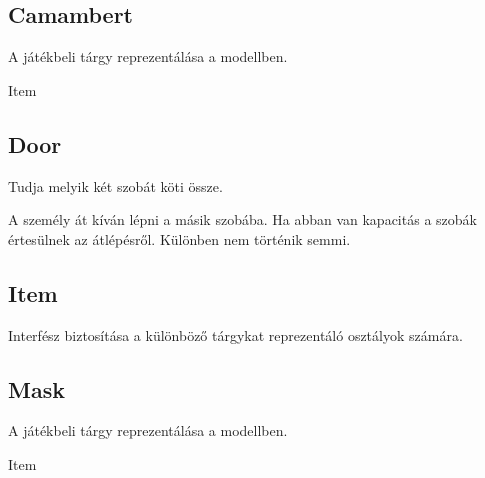 \subsection{Camambert}
\begin{class-template-responsibility}
A játékbeli tárgy reprezentálása a modellben.
\end{class-template-responsibility}
\begin{class-template-interface}
    Item
\end{class-template-interface}

\subsection{Door}
\begin{class-template-responsibility}
    Tudja melyik két szobát köti össze.
    \end{class-template-responsibility}
\begin{class-template-method}
     { A személy át kíván lépni a másik szobába. Ha abban van kapacitás a szobák értesülnek az átlépésről. Különben nem történik semmi.}
\end{class-template-method}

\subsection{Item}
\begin{class-template-responsibility}
    Interfész biztosítása a különböző tárgykat reprezentáló osztályok számára.
\end{class-template-responsibility}
\begin{class-template-method}
\end{class-template-method}

\subsection{Mask}
\begin{class-template-responsibility}
A játékbeli tárgy reprezentálása a modellben.
\end{class-template-responsibility}
\begin{class-template-interface}
    Item
\end{class-template-interface}
\begin{class-template-attribute}
\end{class-template-attribute}

